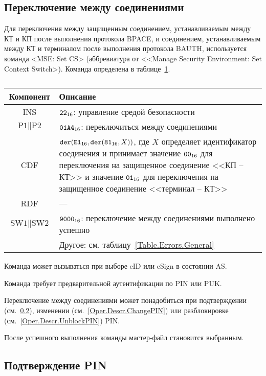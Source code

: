 \subsection{Переключение между соединениями}
\label{Oper.Descr.SetCS}

Для переключения между защищенным соединением,
устанавливаемым между КТ и КП после выполнения 
протокола BPACE, и соединением, 
устанавливаемым между КТ и терминалом после выполнения 
протокола BAUTH, используется команда <MSE: Set CS> (аббревиатура от <<Manage 
Security Environment: Set Context Switch>).
Команда определена в таблице~\ref{Table.Oper.SetCSCmd}.

\begin{table}[hbt]
\caption{}\label{Table.Oper.SetCSCmd}
\begin{tabular}{|c|p{14cm}|}
\hline
Компонент & Описание \\
\hline
\hline
INS & $\texttt{22}_{16}$: управление средой безопасности\\ 
\hline
$\text{P1} \parallel\text{P2}$ & $\texttt{01A4}_{16}$: 
переключиться между соединениями \\
\hline
CDF & 
$\texttt{der}(\texttt{E1}_{16}, \texttt{der}(\texttt{81}_{16}, X))$, 
где $X$ определяет идентификатор
соединения и принимает значение $\texttt{00}_{16}$ для
переключения на защищенное соединение <<КП -- КТ>>
и значение $\texttt{01}_{16}$ для переключения на защищенное
соединение <<терминал -- КТ>>\\ 
\hline 
\hline
RDF &  --- \\
\hline
$\text{SW1} \parallel \text{SW2}$ & 
$\texttt{9000}_{16}$: переключение между соединениями выполнено успешно \\
\cline{2-2}
 & Другое: см. таблицу~\ref{Table.Errors.General} \\
\hline
\end{tabular}
\end{table}

Команда может вызываться при выборе eID или eSign в состоянии AS.

Команда требует предварительной аутентификации по PIN или PUK.

Переключение между соединениями может понадобиться
при подтверждении (см.~\ref{Oper.Descr.VerifyPIN}), 
изменении (см.~\ref{Oper.Descr.ChangePIN})
или разблокировке (см.~\ref{Oper.Descr.UnblockPIN}) PIN.

После успешного выполнения команды мастер-файл становится выбранным. 

\subsection{Подтверждение PIN}
\label{Oper.Descr.VerifyPIN}

